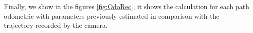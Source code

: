 %
%
\noindent
Finally, we show in the figures \ref{fig:OdoRec}, it shows the calculation for each path odometric with parameters previously estimated in comparison with the trajectory recorded by the camera.
